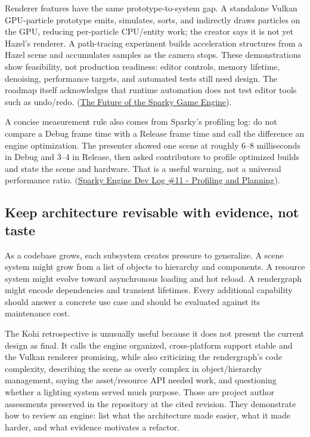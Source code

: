 Renderer features have the same prototype-to-system gap. A standalone Vulkan GPU-particle prototype emits, simulates, sorts, and indirectly draws particles on the GPU, reducing per-particle CPU/entity work; the creator says it is not yet Hazel's renderer. A path-tracing experiment builds acceleration structures from a Hazel scene and accumulates samples as the camera stops. These demonstrations show feasibility, not production readiness: editor controls, memory lifetime, denoising, performance targets, and automated tests still need design. The roadmap itself acknowledges that runtime automation does not test editor tools such as undo/redo. (\href{https://www.youtube.com/watch?v=hUFHzuIyK0g&t=6m27s}{The Future of the Sparky Game Engine}).

A concise measurement rule also comes from Sparky's profiling log: do not compare a Debug frame time with a Release frame time and call the difference an engine optimization. The presenter showed one scene at roughly 6--8 milliseconds in Debug and 3--4 in Release, then asked contributors to profile optimized builds and state the scene and hardware. That is a useful warning, not a universal performance ratio. (\href{https://www.youtube.com/watch?v=cimYa67cR-U&t=6m30s}{Sparky Engine Dev Log \#11 - Profiling and Planning}).

\subsection{Keep architecture revisable with evidence, not taste}\label{06-engine-ii-ch041-keep-architecture-revisable-with-evidence-not-taste}

\hypertarget{06-engine-ii-ch041-keep-architecture-revisable-with-evidence-not-taste}{}

As a codebase grows, each subsystem creates pressure to generalize. A scene system might grow from a list of objects to hierarchy and components. A resource system might evolve toward asynchronous loading and hot reload. A rendergraph might encode dependencies and transient lifetimes. Every additional capability should answer a concrete use case and should be evaluated against its maintenance cost.

The Kohi retrospective is unusually useful because it does not present the current design as final. It calls the engine organized, cross-platform support stable and the Vulkan renderer promising, while also criticizing the rendergraph's code complexity, describing the scene as overly complex in object/hierarchy management, saying the asset/resource API needed work, and questioning whether a lighting system served much purpose. Those are project author assessments preserved in the repository at the cited revision. They demonstrate how to review an engine: list what the architecture made easier, what it made harder, and what evidence motivates a refactor.

